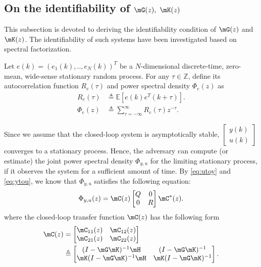 \subsection{On the identifiability of $\mG(z),~\mK(z)$}\label{sec:idGK}
This subsection is devoted to deriving the identifiability condition of $\mG(z)$ and $\mK(z)$. The identifiability of such systems have been investigated based on spectral factorization. 

\begin{mydef}
  Let $e(k)=(e_1(k),..,e_{N}(k))^T$ be a $N$-dimensional discrete-time, zero-mean, wide-sense stationary random process. For any $\tau \in \mathbb{Z}$, define its autocorrelation function $R_e(\tau)$ and power spectral density $\Phi_e(z)$ as
  \begin{align*}		
    R_{e}(\tau)&\triangleq \mathbb{E}[e(k)e^T(k+\tau)].\\
    \Phi_{e}(z)&\triangleq\sum_{\tau=-\infty}^{\infty}R_{e}(\tau)z^{-\tau} .
  \end{align*}
\end{mydef}
Since we assume that the closed-loop system is asymptotically stable, $\left[\begin{smallmatrix}y(k)\\u(k)\end{smallmatrix}\right]$ converges to a stationary process. Hence, the adversary can compute (or estimate) the joint power spectral density $\Phi_{y,u}$ for the limiting stationary process, if it observes the system for a sufficient amount of time. By \eqref{eq:utoy} and \eqref{eq:ytou}, we know that $\Phi_{y,u}$ satisfies the following equation:
  \begin{equation}
    \Phi_{y,u}(z)=\mC(z)\begin{bmatrix} 
      Q & 0 \\ 0 & R 
    \end{bmatrix}\mC^*(z).
  \end{equation} 
  where the closed-loop transfer function $\mC(z)$ has the following form
  \begin{align}
    \mC(z) &=\begin{bmatrix}
      \mC_{11}(z) & \mC_{12}(z)\\
      \mC_{21}(z) & \mC_{22}(z)
    \end{bmatrix}\label{eq:Cz}\\
    &\triangleq\begin{bmatrix}
      (I-\mG\mK)^{-1}\mH & (I-\mG\mK)^{-1}\\
      \mK(I-\mG\mK)^{-1}\mH & \mK(I-\mG\mK)^{-1}
    \end{bmatrix}.\nonumber
  \end{align} 

